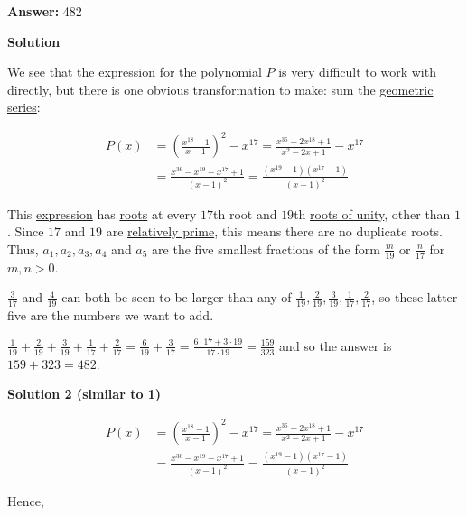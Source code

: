 \begin{enumerate}
 \textbf{Answer: }482



\textbf{Solution}

We see that the expression for the \href{https://artofproblemsolving.com/wiki/index.php?title=Polynomial}{polynomial} $P$ is very difficult to work with directly, but there is one obvious transformation to make: sum the \href{https://artofproblemsolving.com/wiki/index.php?title=Geometric\_series}{geometric series}:

 
 \begin{align*} P(x) &= \left(\frac{x^{18} - 1}{x - 1}\right)^2 - x^{17} = \frac{x^{36} - 2x^{18} + 1}{x^2 - 2x + 1} - x^{17}\\ &= \frac{x^{36} - x^{19} - x^{17} + 1}{(x - 1)^2} = \frac{(x^{19} - 1)(x^{17} - 1)}{(x - 1)^2} \end{align*}


 This \href{https://artofproblemsolving.com/wiki/index.php?title=Expression}{expression} has \href{https://artofproblemsolving.com/wiki/index.php?title=Root}{roots} at every $17$th root and $19$th \href{https://artofproblemsolving.com/wiki/index.php?title=Roots\_of\_unity}{roots of unity}, other than $1$.  Since $17$ and $19$ are \href{https://artofproblemsolving.com/wiki/index.php?title=Relatively\_prime}{relatively prime}, this means there are no duplicate roots.  Thus, $a_1, a_2, a_3, a_4$ and $a_5$ are the five smallest fractions of the form $\frac m{19}$ or $\frac n {17}$ for $m, n > 0$.  

 $\frac 3 {17}$ and $\frac 4{19}$ can both be seen to be larger than any of $\frac1{19}, \frac2{19}, \frac3{19}, \frac 1{17}, \frac2{17}$, so these latter five are the numbers we want to add.

 $\frac1{19}+ \frac2{19}+ \frac3{19}+ \frac 1{17}+ \frac2{17}= \frac6{19} + \frac 3{17} = \frac{6\cdot17 + 3\cdot19}{17\cdot19} = \frac{159}{323}$ and so the answer is $159 + 323 = \boxed{482}$.

 



\textbf{Solution 2 (similar to 1)}


 \begin{align*} P(x) &= \left(\frac{x^{18} - 1}{x - 1}\right)^2 - x^{17} = \frac{x^{36} - 2x^{18} + 1}{x^2 - 2x + 1} - x^{17}\\ &= \frac{x^{36} - x^{19} - x^{17} + 1}{(x - 1)^2} = \frac{(x^{19} - 1)(x^{17} - 1)}{(x - 1)^2} \end{align*}


 Hence,


\end{enumerate}

